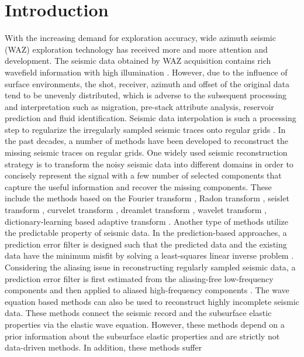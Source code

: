\section{Introduction}
With the increasing demand for exploration accuracy, wide azimuth seismic (WAZ) exploration technology has received more and more attention and development. The seismic data obtained by WAZ acquisition contains rich wavefield information with high illumination \cite[]{yangkang20142,shuwei2016vscan,shaohuan2017gji,kim2017efficient,lu2017coal,tian2017characteristics,fly2017jse,kirchdepth2017jse,qushan2017eage,chenwei2018,qingchen2018gji,qingchen2018tgrs,yufeng2018geo}. However, due to the influence of surface environments, the shot, receiver, azimuth and offset of the original data tend to be unevenly distributed, which is adverse to the subsequent processing and interpretation such as migration, pre-stack attribute analysis, reservoir prediction and fluid identification. Seismic data interpolation is such a processing step to regularize the irregularly sampled seismic traces onto regular grids \cite[]{fomel2003,yangkang2016irr5d,shaohuan2016seg,yatong2018dbi,zhangdong2016seg,yangkang2016fwieage,yangkang2016fwi,zhangdong2016cseg,zhangdong2016eage}. In the past decades, a number of methods have been developed to reconstruct the missing seismic traces on regular grids. One widely used seismic reconstruction strategy is to transform the noisy seismic data into different domains in order to concisely represent the signal with a few number of selected components that capture the useful information and recover the missing components. These include the methods based on the Fourier transform \cite[]{yatong2017pocs,baimin2018jse2}, Radon transform \cite[]{beylkin1987discrete}, seislet transform \cite[]{shuwei20153,shuwei2015seg1,shuwei2015seg2,liuwei2016dealiase,zhiguang2017fwi,yatong2018seis,yatong2018jse,yangkang2018eseis,baimin2019jse1}, curvelet transform \cite[]{jianwei20093,candes20061,shaohuan2015,shaohuan2016seg2}, dreamlet transform \cite[]{benfengpocs}, wavelet transform \cite[]{rioul1991wavelets,gilles2013,xieqian2015eage,liuwei2016,mostafa2016bssa}, dictionary-learning based adaptive transform \cite[]{yangkang2016dsd,amir2017ieee,amir2017sp,amir2017geo,wujuan2018jge2,wujuan2018cg1,shaohuan2019ieee,shaohuan2019dl}. Another type of methods utilize the predictable property of seismic data. In the prediction-based approaches, a prediction error filter is designed such that the predicted data and the existing data have the minimum misfit by solving a least-squares linear inverse problem \cite[]{spitz1991,fomel2002pwd,yangkang2016irr5d}.  Considering the aliasing issue in reconstructing regularly sampled seismic data, a prediction error filter is first estimated from the aliasing-free low-frequency components and then applied to aliased high-frequency components \cite[]{mostafa2007}. The wave equation based methods can also be used to reconstruct highly incomplete seismic data. These methods connect the seismic record and the subsurface elastic properties via the elastic wave equation. However, these methods depend on a prior information about the subsurface elastic properties and are strictly not data-driven methods. In addition, these methods suffer 